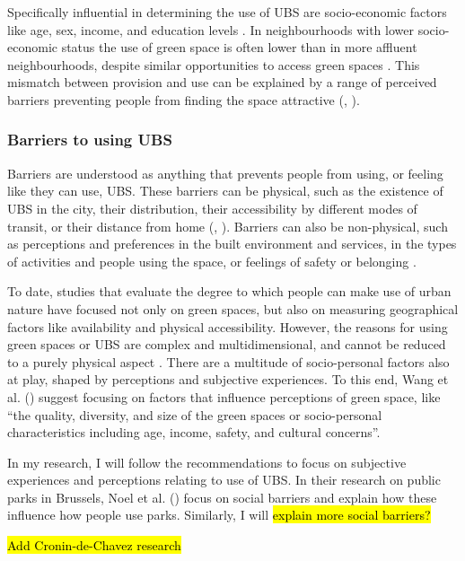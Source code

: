 \documentclass{article}
\begin{document}
Specifically influential in determining the use of UBS are socio-economic factors like age, sex, income, and education levels \parencite{phillips2021use}. In neighbourhoods with lower socio-economic status the use of green space is often lower than in more affluent neighbourhoods, despite similar opportunities to access green spaces \parencite{wang2015comparison}. This mismatch between provision and use can be explained by a range of perceived barriers preventing people from finding the space attractive (\cite{wang2015physical}, \cite{noel2021social}).

\subsubsection{Barriers to using UBS}

Barriers are understood as anything that prevents people from using, or feeling like they can use, UBS.
These barriers can be physical, such as the existence of UBS in the city, their distribution, their accessibility by different modes of transit, or their distance from home (\cite{REF}, \cite{REF}). Barriers can also be non-physical, such as perceptions and preferences in the built environment and services, in the types of activities and people using the space, or feelings of safety or belonging \parencite{REF}.

To date, studies that evaluate the degree to which people can make use of urban nature have focused not only on green spaces, but also on measuring geographical factors like availability and physical accessibility.
However, the reasons for using green spaces or UBS are complex and multidimensional, and cannot be reduced to a purely physical aspect \parencite{wang2015physical}. There are a multitude of socio-personal factors also at play, shaped by perceptions and subjective experiences. To this end, Wang et al. (\citeyear{wang2015physical}) suggest focusing on factors that influence perceptions of green space, like ``the quality, diversity, and size of the green spaces or socio-personal characteristics including age, income, safety, and cultural concerns''.

In my research, I will follow the recommendations to focus on subjective experiences and perceptions relating to use of UBS. In their research on public parks in Brussels, Noel et al. (\citeyear{noel2021social}) focus on social barriers and explain how these influence how people use parks. Similarly, I will 
\hl{explain more social barriers?} 

\hl{Add Cronin-de-Chavez research}
\end{document}
